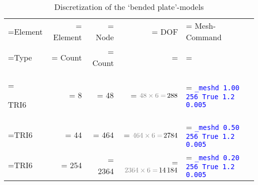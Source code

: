 \begin{table}[htbp]
    \centering
    \caption{Discretization of the ‘bended plate’-models}
    \label{bended-plate:tab:plaxis-meshd}
    \begin{tabularx}{\textwidth}{
            >{\hsize\linewidth=\hsize}X
            >{\hsize\linewidth=\hsize}R
            >{\hsize\linewidth=\hsize}R
            >{\hsize\linewidth=\hsize}R
            >{\hsize\linewidth=\hsize}Y}

        \hline


        Element                         & Element                                             & Node           & DOF                                        & Mesh-Command \\

        Type                            & Count                                               & Count          &                                            &              \\

        \hline

        TRI6                            & \qty{8}{}                                           & \qty{ 48}{}    & $ \textcolor{gray}{\qty{ 48}{} \times 6 =
        }\,\qty{ 288}{} $               & {\texttt{\textcolor{blue}{\_meshd 1.00 256 True 1.2
        0.005}}}                                                                                                                                                           \\

        TRI6                            & \qty{44}{}                                          & \qty{ 464}{}   & $ \textcolor{gray}{\qty{ 464}{} \times 6 =
        }\,\qty{ 2784}{} $              & {\texttt{\textcolor{blue}{\_meshd 0.50 256 True 1.2
        0.005}}}                                                                                                                                                           \\

        TRI6                            & \qty{254}{}                                         & \qty{ 2364}{}  & $ \textcolor{gray}{\qty{ 2364}{} \times 6
        = }\,\qty{ 14184}{} $           & {\texttt{\textcolor{blue}{\_meshd 0.20 256 True 1.2
        0.005}}}                                                                                                                                                           \\


\end{tabularx}
\end{table}
